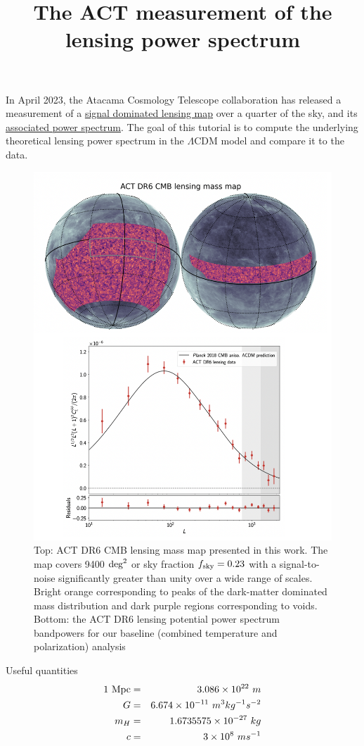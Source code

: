 \documentclass[a4paper, 11pt]{article}
\title{The ACT measurement of the lensing power spectrum}
\def\ba{\begin{eqnarray}}
\def\ea{\end{eqnarray}}
\begin{document}
\maketitle

In April 2023, the Atacama Cosmology Telescope collaboration has released a measurement of a \href{https://arxiv.org/abs/2304.05203}{signal dominated lensing map} over a quarter of the sky, and its \href{https://arxiv.org/abs/2304.05202}{associated power spectrum}. The goal of this tutorial is to compute 
the underlying theoretical lensing power spectrum in the $\Lambda$CDM model and compare it to the data.

\begin{figure}[h!]
  \centering
  \includegraphics[width=0.7\columnwidth]{lensing_dr6.png}
  \caption{Top: ACT DR6 CMB lensing mass map presented in this work. The map covers 9400 ${\rm deg}^{2}$
or sky fraction $f_{\rm sky} = 0.23$ with a signal-to-noise significantly greater than unity over a wide range of scales. Bright orange corresponding to peaks of the dark-matter dominated mass distribution and
dark purple regions corresponding to voids. Bottom: the ACT DR6 lensing potential power spectrum bandpowers for our baseline (combined temperature and polarization) analysis}
  \label{fig:dr6_lensing}
\end{figure}



Useful quantities
\ba
1 \ \rm{Mpc} &=& 3.086 \times 10^{22} \ m \nonumber \\
G &=& 6.674 \times 10^{-11}  \  m^{3} kg^{-1} s^{-2} \nonumber \\
m_{H} &=& 1.6735575  \times10^{-27}  \ kg\nonumber \\
c &=& 3 \times 10^{8} \ m s^{-1} \nonumber \\
\ea
\end{document}
